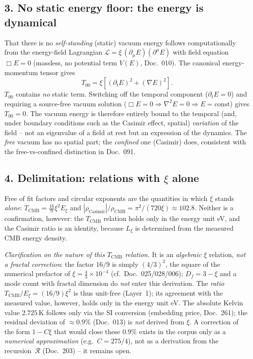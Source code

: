 \subsection*{3. No static energy floor: the energy is dynamical}

That there is no \emph{self-standing} (static) vacuum energy follows
computationally from the energy-field Lagrangian $\mathcal{L}=\xi\,(\partial_\mu
E)(\partial^\mu E)$ with field equation $\Box E=0$ (massless, no potential term
$V(E)$, Doc.~010). The canonical energy-momentum tensor gives
\[
  T_{00} = \xi\left[(\partial_t E)^2 + (\nabla E)^2\right].
\]
$T_{00}$ contains \emph{no} static term. Switching off the temporal component
($\partial_t E=0$) and requiring a source-free vacuum solution
($\Box E=0\Rightarrow\nabla^2 E=0\Rightarrow E=\text{const}$) gives
$T_{00}=0$. The vacuum energy is therefore entirely bound to the temporal
(and, under boundary conditions such as the Casimir effect, spatial)
\emph{variation} of the field -- not an eigenvalue of a field at rest but an
expression of the dynamics. The \emph{free} vacuum has no spatial part; the
\emph{confined} one (Casimir) does, consistent with the free-vs-confined
distinction in Doc.~091.

\subsection*{4. Delimitation: relations with $\xi$ alone}

Free of fit factors and circular exponents are the quantities in which $\xi$ stands \emph{alone}: $T_{\text{CMB}}=\tfrac{16}{9}\xi^2 E_\xi$ and
$|\rho_{\text{Casimir}}|/\rho_{\text{CMB}}=\pi^2/(720\xi)\approx102.8$. Neither is a confirmation, however: the $T_{\text{CMB}}$ relation holds only in the energy unit eV, and the Casimir ratio is an identity, because $L_\xi$ is determined from the measured CMB energy density.

\emph{Clarification on the nature of this $T_{\text{CMB}}$ relation.} It is an
\emph{algebraic} $\xi$ relation, \emph{not a fractal correction}: the factor
$16/9$ is simply $(4/3)^2$, the square of the numerical prefactor of
$\xi = \tfrac{4}{3}\times10^{-4}$ (cf.\ Doc.~025/028/006); $D_f = 3-\xi$ and a
mode count with fractal dimension do \emph{not} enter this derivation. The \emph{ratio}
$T_{\text{CMB}}/E_\xi = (16/9)\xi^2$ is thus unit-free (Layer~1); its agreement
with the measured value, however, holds only in the energy unit eV. The absolute Kelvin value $2.725$\,K follows only via the SI
conversion (embedding price, Doc.~261); the residual deviation of
$\approx 0.9\%$ (Doc.~013) is \emph{not} derived from $\xi$. A correction of the
form $1-C\xi$ that would close these $0.9\%$ exists in the corpus only as a
\emph{numerical approximation} (e.g.\ $C=275/4$), not as a derivation from the
recursion~$\mathcal{R}$ (Doc.~203) -- it remains open.

